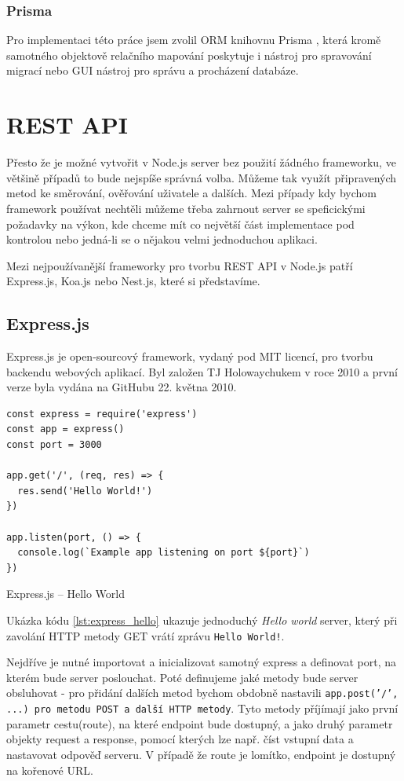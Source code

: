 \documentclass[thesis=M,czech]{FITthesis}[2019/12/23]
\begin{document}
\subsubsection*{Prisma}
Pro implementaci této práce jsem zvolil ORM knihovnu Prisma \cite{prisma}, která kromě samotného objektově relačního mapování poskytuje i nástroj pro spravování migrací nebo GUI nástroj pro správu a procházení databáze.

\section{REST API}
Přesto že je možné vytvořit v Node.js server bez použití žádného frameworku, ve většině případů to bude nejspíše správná volba. Můžeme tak využít připravených metod ke směrování, ověřování uživatele a dalších. Mezi případy kdy bychom framework používat nechtěli můžeme třeba zahrnout server se speficickými požadavky na výkon, kde chceme mít co největší část implementace pod kontrolou nebo jedná-li se o nějakou velmi jednoduchou aplikaci.

Mezi nejpoužívanější frameworky pro tvorbu REST API v Node.js patří Express.js, Koa.js nebo Nest.js, které si představíme.
\subsection*{Express.js}
Express.js je open-sourcový framework, vydaný pod MIT licencí, pro tvorbu backendu webových aplikací. Byl založen TJ Holowaychukem v roce 2010 a první verze byla vydána na GitHubu 22. května 2010.

\begin{listing}[H]
\begin{verbatim}
const express = require('express')
const app = express()
const port = 3000

app.get('/', (req, res) => {
  res.send('Hello World!')
})

app.listen(port, () => {
  console.log(`Example app listening on port ${port}`)
})
\end{verbatim}
\caption{Express.js -- Hello World}
\label{lst:express_hello}
\end{listing}

Ukázka kódu \ref{lst:express_hello} ukazuje jednoduchý \textit{Hello world} server, který při zavolání HTTP metody GET vrátí zprávu \texttt{Hello World!}. 

Nejdříve je nutné importovat a inicializovat samotný express a definovat port, na kterém bude server poslouchat. Poté definujeme jaké metody bude server obsluhovat - pro přidání dalších metod bychom obdobně nastavili \texttt{app.post('/', ...) pro metodu POST a další HTTP metody}. Tyto metody příjímají jako první parametr cestu(route), na které endpoint bude dostupný, a jako druhý parametr objekty request a response, pomocí kterých lze např. číst vstupní data a nastavovat odpověď serveru. V případě že route je lomítko, endpoint je dostupný na kořenové URL.
\end{document}
